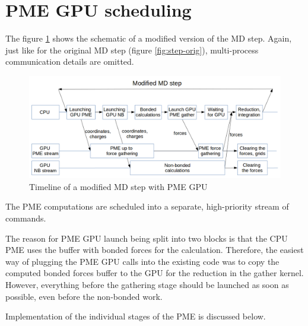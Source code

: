 \documentclass[12pt,a4paper]{report}
\begin{document}
%


\section{PME GPU scheduling}

The figure \ref{fig:step-gpu} shows the schematic of a modified version of the MD step. Again, just like for the original MD step (figure \ref{fig:step-orig}), multi-process communication details are omitted. 
\begin{figure}[h!]
    \centering
    \includegraphics[width=1\textwidth]{pics/mdstep-gpu.png}
    \caption{Timeline of a modified MD step with PME GPU}
    \label{fig:step-gpu}
\end{figure}
\FloatBarrier

The PME computations are scheduled into a separate, high-priority stream of commands.

The reason for PME GPU launch being split into two blocks is that the CPU PME uses the buffer with bonded forces for the calculation.
Therefore, the easiest way of plugging the PME GPU calls into the existing code was to copy the computed bonded forces buffer to the GPU for the reduction in the gather kernel. However, everything before the gathering stage should be launched as soon as possible, even before the non-bonded work.





Implementation of the individual stages of the PME is discussed below.
\end{document}
